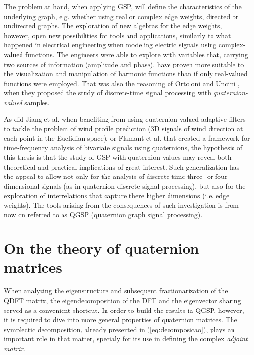 The problem at hand, when applying GSP, will define the characteristics of the underlying graph, e.g. whether using real or complex edge weights, directed or undirected graphs. The exploration of new algebras for the edge weights, however, open new possibilities for tools and applications, similarly to what happened in electrical engineering when modeling electric signals using complex-valued functions. The engineers were able to explore with variables that, carrying two sources of information (amplitude and phase), have proven more suitable to the visualization and manipulation of harmonic functions than if only real-valued functions were employed. That was also the reasoning of Ortoloni and Uncini \cite{ortolani2016quaternion}, when they proposed the study of discrete-time signal processing with \emph{quaternion-valued} samples.

As did Jiang et al. \cite{jiang2013frequency} when benefiting from using quaternion-valued adaptive filters to tackle the problem of wind profile prediction (3D signals of wind direction at each point in the Euclidian space), or Flamant et al. \cite{flamant2018complete} that created a framework for time-frequency analysis of bivariate signals using quaternions, the hypothesis of this thesis is that the study of GSP with quaternion values may reveal both theoretical and practical implications of great interest. Such generalization has the appeal to allow not only for the analysis of discrete-time three- or four-dimensional signals (as in quaternion discrete signal processing), but also for the exploration of interrelations that capture there higher dimensions (i.e. edge weights). The tools arising from the consequences of such investigation is from now on referred to as QGSP (quaternion graph signal processing).

\section{On the theory of quaternion matrices}

When analyzing the eigenstructure and subsequent fractionarization of the QDFT matrix, the eigendecomposition of the DFT and the eigenvector sharing served as a convenient shortcut. In order to build the results in QGSP, however, it is required to dive into more general properties of quaternion matrices. The symplectic decomposition, already presented in (\ref{eq:decomposicao}), plays an important role in that matter, specialy for its use in defining the complex\textit{ adjoint matrix}.

